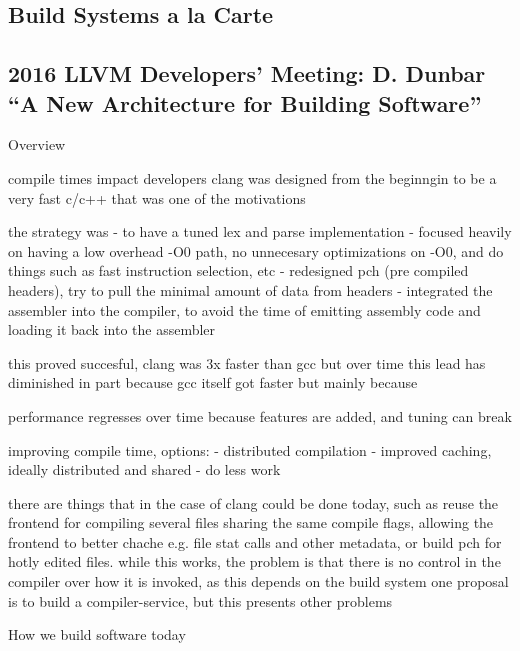 \documentclass[12pt, a4paper]{report}
\begin{document}
\cite{hejlsberg_modern_compiler_construction}

\subsection*{Build Systems a la Carte}

\cite{mokhov2018build}

\subsection*{2016 LLVM Developers’ Meeting: D. Dunbar “A New Architecture for Building Software”}

\cite{dunbar2016}

Overview

compile times impact developers
clang was designed from the beginngin to be a very fast c/c++
that was one of the motivations

the strategy was
- to have a tuned lex and parse implementation
- focused heavily on having a low overhead -O0 path, no unnecesary optimizations on -O0, and do things such as fast instruction selection, etc
- redesigned pch (pre compiled headers), try to pull the minimal amount of data from headers
- integrated the assembler into the compiler, to avoid the time of emitting assembly code and loading it back into the assembler

this proved succesful, clang was 3x faster than gcc
but over time this lead has diminished
in part because gcc itself got faster but mainly because

performance regresses over time because features are added, and tuning can break

improving compile time, options:
- distributed compilation
- improved caching, ideally distributed and shared
- do less work

there are things that in the case of clang could be done today, such as reuse the frontend for compiling several files sharing the same compile flags, allowing the frontend to better chache e.g. file stat calls and other metadata, or build pch for hotly edited files.
while this works, the problem is that there is no control in the compiler over how it is invoked, as this depends on the build system
one proposal is to build a compiler-service, but this presents other problems

How we build software today
\end{document}
